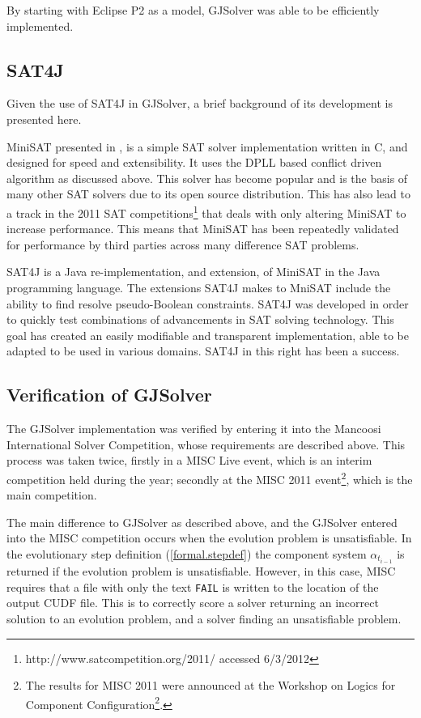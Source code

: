 By starting with Eclipse P2 as a model, GJSolver was able to be efficiently implemented.

\subsection{SAT4J}
Given the use of SAT4J in GJSolver, a brief background of its development is presented here.

MiniSAT presented in \citep{een2003}, is a simple SAT solver implementation written in C, and designed for speed and extensibility.
It uses the DPLL based conflict driven algorithm as discussed above.
This solver has become popular and is the basis of many other SAT solvers due to its open source distribution.
This has also lead to a track in the 2011 SAT competitions\footnote{http://www.satcompetition.org/2011/ accessed 6/3/2012} that deals with only altering MiniSAT to increase performance.
This means that MiniSAT has been repeatedly validated for performance by third parties across many difference SAT problems. 

SAT4J \citep{le2010sat4j} is a Java re-implementation, and extension, of MiniSAT in the Java programming language.
The extensions SAT4J makes to MniSAT include the ability to find resolve pseudo-Boolean constraints.
SAT4J was developed in order to quickly test combinations of advancements in SAT solving technology.
This goal has created an easily modifiable and transparent implementation, able to be adapted to be used in various domains.
SAT4J in this right has been a success.

\subsection{Verification of GJSolver}
\label{impl.verif}
The GJSolver implementation was verified by entering it into the Mancoosi International Solver Competition, whose requirements are described above.
This process was taken twice, firstly in a MISC Live event, which is an interim competition held during the year;
secondly at the MISC 2011 event\footnote{The results for MISC 2011 were announced at the Workshop on Logics for Component Configuration\footnote{http://www.pps.jussieu.fr/~treinen/lococo/2011/ accessed 6/3/2012}.}, 
which is the main competition. 

The main difference to GJSolver as described above, and the GJSolver entered into the MISC competition occurs when the evolution problem is unsatisfiable.
In the evolutionary step definition (\ref{formal.stepdef}) the component system $\alpha_{t_{i-1}}$ is returned if the evolution problem is unsatisfiable.
However, in this case, MISC requires that a file with only the text \texttt{FAIL} is written to the location of the output CUDF file.
This is to correctly score a solver returning an incorrect solution to an evolution problem, 
and a solver finding an unsatisfiable problem.

